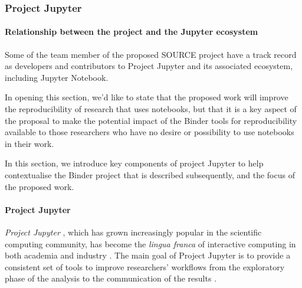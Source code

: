 \subsubsection{Project Jupyter}
\label{sec:project-jupyter}


\paragraph{Relationship between the \TheProject{}project and the Jupyter ecosystem}

Some of the team member of the proposed SOURCE project have a track record as
developers and contributors to Project Jupyter and its associated
ecosystem, including Jupyter Notebook.

In opening this section, we'd like to state that the proposed work will improve
the reproducibility of research that uses notebooks, but that it is a key aspect
of the proposal to make the potential impact of the Binder tools for
reproducibility available to those researchers who have no desire or possibility
to use notebooks in their work.

In this section, we introduce key components of project Jupyter to help
contextualise the Binder project that is described subsequently, and the focus
of the proposed work.




\paragraph{Project Jupyter}

\emph{Project Jupyter} \cite{Jupyter}, which has grown increasingly popular in the scientific
computing community, has become the \emph{lingua franca} of interactive
computing in both academia and industry \cite{Perkel2018}. The main goal of Project Jupyter
is to provide a consistent set of tools to improve researchers'
workflows from the exploratory phase of the analysis to the communication
of the results \cite{Kluyver2016,Granger2021}.

